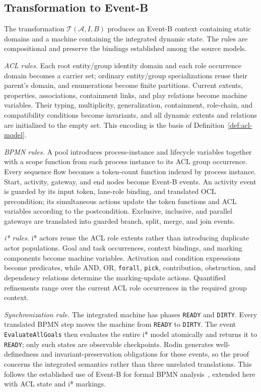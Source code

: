 \documentclass[a4paper, conference]{IEEEtran}
\begin{document}
\subsection{Transformation to Event-B}
\label{sec:eventb-transformation}

The transformation $\mathcal T(\mathcal A,I,B)$ produces an Event-B context containing static domains and a machine containing the integrated dynamic state. The rules are compositional and preserve the bindings established among the source models.

\emph{ACL rules.} Each root entity/group identity domain and each role occurrence domain becomes a carrier set; ordinary entity/group specializations reuse their parent's domain, and enumerations become finite partitions. Current extents, properties, associations, containment links, and play relations become machine variables. Their typing, multiplicity, generalization, containment, role-chain, and compatibility conditions become invariants, and all dynamic extents and relations are initialized to the empty set. This encoding is the basis of Definition~\ref{def:acl-model}.

\emph{BPMN rules.} A pool introduces process-instance and lifecycle variables together with a scope function from each process instance to its ACL group occurrence. Every sequence flow becomes a token-count function indexed by process instance. Start, activity, gateway, and end nodes become Event-B events. An activity event is guarded by its input token, lane-role binding, and translated OCL precondition; its simultaneous actions update the token functions and ACL variables according to the postcondition. Exclusive, inclusive, and parallel gateways are translated into guarded branch, split, merge, and join events.

\emph{i* rules.} i* actors reuse the ACL role extents rather than introducing duplicate actor populations. Goal and task occurrences, context bindings, and marking components become machine variables. Activation and condition expressions become predicates, while AND, OR, \texttt{forall}, \texttt{pick}, contribution, obstruction, and dependency relations determine the marking-update actions. Quantified refinements range over the current ACL role occurrences in the required group context.

\emph{Synchronization rule.} The integrated machine has phases \texttt{READY} and \texttt{DIRTY}. Every translated BPMN step moves the machine from \texttt{READY} to \texttt{DIRTY}. The event \texttt{EvaluateAllGoals} then evaluates the entire i* model atomically and returns it to \texttt{READY}; only such states are observable checkpoints. Rodin generates well-definedness and invariant-preservation obligations for these events, so the proof concerns the integrated semantics rather than three unrelated translations. This follows the established use of Event-B for formal BPMN analysis~\cite{bryans2010eventb}, extended here with ACL state and i* markings.
\end{document}
